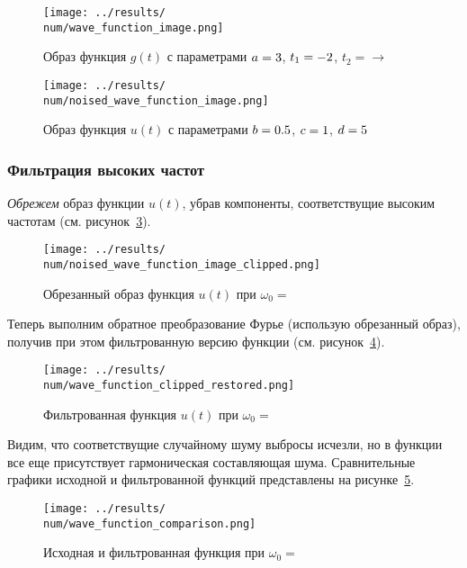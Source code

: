 \begin{figure}[ht!]
    \centering
    \texttt{[image: ../results/\\num/wave\_function\_image.png]}
    \caption{Образ функция $g(t)$ с параметрами $a = 3$, $t_1 = -2$, $t_2 = \to$}
    \label{fig:wave_function_image_\num}
\end{figure}

\begin{figure}[ht!]
    \centering
    \texttt{[image: ../results/\\num/noised\_wave\_function\_image.png]}
    \caption{Образ функция $u(t)$ с параметрами $b = 0.5$, $c = 1$, $d = 5$}
    \label{fig:noised_wave_function_image_\num}
\end{figure}

\FloatBarrier
\subsubsection{Фильтрация высоких частот}
\textit{Обрежем} образ функции $u(t)$, убрав компоненты, соответствущие высоким частотам (см. рисунок~\ref{fig:noised_wave_function_image_clipped_\num}).

\begin{figure}[ht!]
    \centering
    \texttt{[image: ../results/\\num/noised\_wave\_function\_image\_clipped.png]}
    \caption{Обрезанный образ функция $u(t)$ при $\omega_0=$~\imageclip}
    \label{fig:noised_wave_function_image_clipped_\num}
\end{figure}

Теперь выполним обратное преобразование Фурье (использую обрезанный образ), получив при этом фильтрованную версию функции (см. рисунок~\ref{fig:wave_function_clipped_restored_\num}).

\begin{figure}[ht!]
    \centering
    \texttt{[image: ../results/\\num/wave\_function\_clipped\_restored.png]}
    \caption{Фильтрованная функция $u(t)$ при $\omega_0=$~\imageclip}
    \label{fig:wave_function_clipped_restored_\num}
\end{figure}

Видим, что соответствущие случайному шуму выбросы исчезли, но в функции все еще присутствует гармоническая составляющая шума. 
Сравнительные графики исходной и фильтрованной функций представлены на рисунке~\ref{fig:wave_function_comparison_\num}. 
\begin{figure}[ht!]
    \centering
    \texttt{[image: ../results/\\num/wave\_function\_comparison.png]}
    \caption{Исходная и фильтрованная функция при $\omega_0=$~\imageclip}
    \label{fig:wave_function_comparison_\num}
\end{figure}

